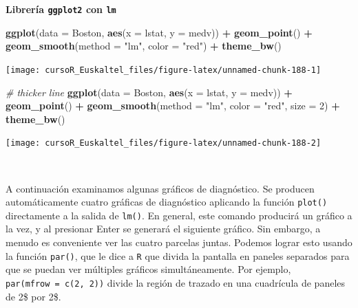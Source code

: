 \documentclass[]{book}
\newenvironment{Shaded}{\begin{snugshade}}{\end{snugshade}}
\newcommand{\KeywordTok}[1]{\textcolor[rgb]{0.13,0.29,0.53}{\textbf{#1}}}
\newcommand{\DataTypeTok}[1]{\textcolor[rgb]{0.13,0.29,0.53}{#1}}
\newcommand{\DecValTok}[1]{\textcolor[rgb]{0.00,0.00,0.81}{#1}}
\newcommand{\StringTok}[1]{\textcolor[rgb]{0.31,0.60,0.02}{#1}}
\newcommand{\CommentTok}[1]{\textcolor[rgb]{0.56,0.35,0.01}{\textit{#1}}}
\newcommand{\OperatorTok}[1]{\textcolor[rgb]{0.81,0.36,0.00}{\textbf{#1}}}
\newcommand{\NormalTok}[1]{#1}
\begin{document}
\textbf{Librería \texttt{ggplot2} con \texttt{lm}}

\begin{Shaded}
\begin{Highlighting}[]
\KeywordTok{ggplot}\NormalTok{(}\DataTypeTok{data =}\NormalTok{ Boston, }\KeywordTok{aes}\NormalTok{(}\DataTypeTok{x =}\NormalTok{ lstat, }\DataTypeTok{y =}\NormalTok{ medv)) }\OperatorTok{+}
\StringTok{  }\KeywordTok{geom_point}\NormalTok{() }\OperatorTok{+}
\StringTok{  }\KeywordTok{geom_smooth}\NormalTok{(}\DataTypeTok{method =} \StringTok{"lm"}\NormalTok{, }\DataTypeTok{color =} \StringTok{"red"}\NormalTok{) }\OperatorTok{+}
\StringTok{  }\KeywordTok{theme_bw}\NormalTok{()}
\end{Highlighting}
\end{Shaded}

\begin{center}\texttt{[image: cursoR\_Euskaltel\_files/figure-latex/unnamed-chunk-188-1]} \end{center}

\begin{Shaded}
\begin{Highlighting}[]
\CommentTok{# thicker line}
\KeywordTok{ggplot}\NormalTok{(}\DataTypeTok{data =}\NormalTok{ Boston, }\KeywordTok{aes}\NormalTok{(}\DataTypeTok{x =}\NormalTok{ lstat, }\DataTypeTok{y =}\NormalTok{ medv)) }\OperatorTok{+}
\StringTok{  }\KeywordTok{geom_point}\NormalTok{() }\OperatorTok{+}
\StringTok{  }\KeywordTok{geom_smooth}\NormalTok{(}\DataTypeTok{method =} \StringTok{"lm"}\NormalTok{, }\DataTypeTok{color =} \StringTok{"red"}\NormalTok{, }\DataTypeTok{size =} \DecValTok{2}\NormalTok{) }\OperatorTok{+}
\StringTok{  }\KeywordTok{theme_bw}\NormalTok{()}
\end{Highlighting}
\end{Shaded}

\begin{center}\texttt{[image: cursoR\_Euskaltel\_files/figure-latex/unnamed-chunk-188-2]} \end{center}

~

A continuación examinamos algunas gráficos de diagnóstico. Se producen
automáticamente cuatro gráficas de diagnóstico aplicando la función
\texttt{plot()} directamente a la salida de \texttt{lm()}. En general,
este comando producirá un gráfico a la vez, y al presionar Enter se
generará el siguiente gráfico. Sin embargo, a menudo es conveniente ver
las cuatro parcelas juntas. Podemos lograr esto usando la función
\texttt{par()}, que le dice a \texttt{R} que divida la pantalla en
paneles separados para que se puedan ver múltiples gráficos
simultáneamente. Por ejemplo, \texttt{par(mfrow\ =\ c(2,\ 2))} divide la
región de trazado en una cuadrícula de paneles de 2\$ por 2\$.
\end{document}

